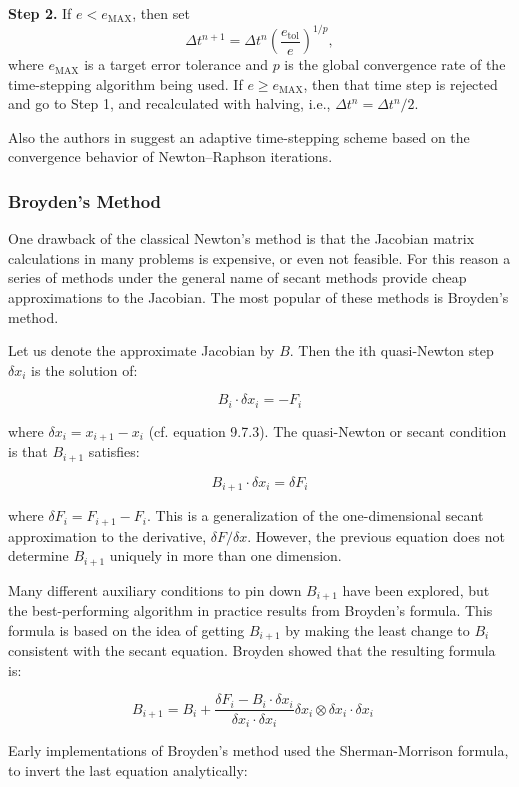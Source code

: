 \documentclass{article}
\begin{document}
\textbf{Step 2.} If $e < e_{\text{MAX}}$, then set
\begin{equation}
\Delta t^{n+1} = \Delta t^n {\left( \frac{e_{\text{tol}}}{e}\right)}^{1/p},
\end{equation}
where $e_{\text{MAX}}$ is a target error tolerance and $p$ is the global convergence rate of the time-stepping algorithm being used. If $e \geq e_{\text{MAX}}$, then that time step is rejected and go to Step 1, and recalculated with halving, i.e., $\Delta t^n = \Delta t^n/2$.

Also the authors in \cite{ref21} suggest an adaptive time-stepping scheme based on the convergence behavior of Newton–Raphson iterations. 
\subsubsection{ Broyden’s Method}
One drawback of the classical Newton's method is that the Jacobian matrix calculations in many problems is expensive, or even not feasible. For this reason a series of methods under the general name of secant methods provide cheap approximations to the Jacobian. The most popular of these methods is Broyden’s method.

Let us denote the approximate Jacobian by $B$. Then the ith quasi-Newton step $\delta x_i$ is the solution of:

\[
B_i \cdot \delta x_i = -F_i 
\]

where $\delta x_i = x_{i+1} - x_i$ (cf. equation 9.7.3). The quasi-Newton or secant condition is that $B_{i+1}$ satisfies:

\[
B_{i+1} \cdot \delta x_i = \delta F_i 
\]

where $\delta F_i = F_{i+1} - F_i$. This is a generalization of the one-dimensional secant approximation to the derivative, $\delta F/\delta x$. However, the previous equation does not determine $B_{i+1}$ uniquely in more than one dimension.

Many different auxiliary conditions to pin down $B_{i+1}$ have been explored, but the best-performing algorithm in practice results from Broyden’s formula. This formula is based on the idea of getting $B_{i+1}$ by making the least change to $B_i$ consistent with the secant equation. Broyden showed that the resulting formula is:

\[
B_{i+1} = B_i + \frac{\delta F_i - B_i \cdot \delta x_i}{\delta x_i \cdot \delta x_i} \delta x_i \otimes \delta x_i \cdot \delta x_i \quad 
\]


Early implementations of Broyden’s method used the Sherman-Morrison formula, to invert the last equation  analytically:
\end{document}
